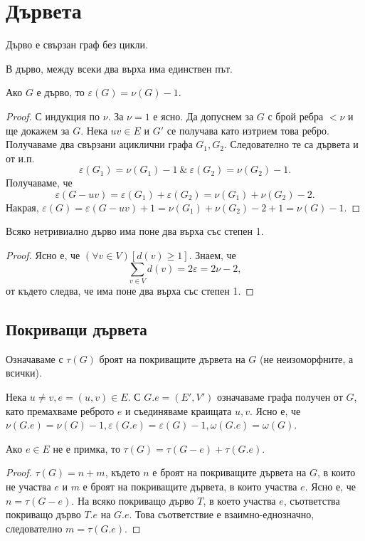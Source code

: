 \section{Дървета}

\begin{dfn}
  Дърво е свързан граф без цикли.
\end{dfn}

\begin{thm}
  В дърво, между всеки два върха има единствен път.
\end{thm}

\begin{thm}
  Ако $G$ е дърво, то $\varepsilon(G) = \nu(G) - 1$.
\end{thm}
\begin{proof}
  С индукция по $\nu$. За $\nu = 1$ е ясно.
  Да допуснем за $G$ с брой ребра $<\nu$ и ще докажем за $G$.
  Нека $uv\in E$ и $G'$ се получава като изтрием това ребро.
  Получаваме два свързани ациклични графа $G_1, G_2$.
  Следователно те са дървета и от и.п. 
  \[\varepsilon(G_1) = \nu(G_1) - 1\ \&\ \varepsilon(G_2) = \nu(G_2) - 1.\]
  Получаваме, че 
  \[\varepsilon(G - uv) = \varepsilon(G_1) + \varepsilon(G_2) = \nu(G_1) + \nu(G_2) - 2.\]
  Накрая, $\varepsilon(G) = \varepsilon(G-uv) + 1 = \nu(G_1) + \nu(G_2) - 2 + 1= \nu(G) - 1$.
\end{proof}

\begin{crl}
  Всяко нетривиално дърво има поне два върха със степен 1.
\end{crl}
\begin{proof}
  Ясно е, че $(\forall v\in V)[d(v) \geq 1]$.
  Знаем, че \[\sum_{v\in V}d(v) = 2\varepsilon = 2\nu - 2,\] от където следва, че има поне два върха със степен 1.
\end{proof}



\subsection{Покриващи дървета}

Означаваме с $\tau(G)$ броят на покриващите дървета на $G$ (не неизоморфните, а всички).

Нека $u\neq v, e = (u,v)\in E$. С $G.e = (E',V')$ означаваме графа получен от $G$, като премахваме реброто $e$ и 
съединяваме краищата $u,v$. Ясно е, че $\nu(G.e) = \nu(G) - 1, \varepsilon(G.e) = \varepsilon(G) - 1, \omega(G.e) = \omega(G)$.

\begin{thm}
  Ако $e\in E$ не е примка, то
  $\tau(G) = \tau(G-e) + \tau(G.e)$.
\end{thm}
\begin{proof}
  $\tau(G) = n + m$, където $n$ е броят на покриващите дървета на $G$, в които не участва $e$
  и $m$ е броят на покриващите дървета, в които участва $e$.
  Ясно е, че $n = \tau(G-e)$.
  На всяко покриващо дърво $T$, в което участва $e$, съответства покриващо дърво $T.e$ на $G.e$.
  Това съответствие е взаимно-еднозначно, следователно $m = \tau(G.e)$.
\end{proof}

